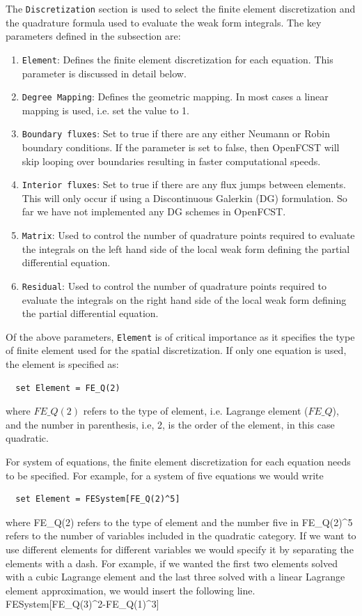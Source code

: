 The \texttt{Discretization} section is used to select the finite element discretization and the quadrature formula used to evaluate the weak form integrals. The key parameters defined in the subsection are:
\begin{enumerate}
\item \texttt{Element}: Defines the finite element discretization for each equation. This parameter is discussed in detail below.
\item \texttt{Degree Mapping}: Defines the geometric mapping. In most cases a linear mapping is used, i.e. set the value to 1.
\item \texttt{Boundary fluxes}: Set to true if there are any either Neumann or Robin boundary conditions. If the parameter is set to false, then OpenFCST will skip looping over boundaries resulting in faster computational speeds.
\item \texttt{Interior fluxes}: Set to true if there are any flux jumps between elements. This will only occur if using a Discontinuous Galerkin (DG) formulation. So far we have not implemented any DG schemes in OpenFCST.
\item \texttt{Matrix}: Used to control the number of quadrature points required to evaluate the integrals on the left hand side of the local weak form defining the partial differential equation. 
\item \texttt{Residual}: Used to control the number of quadrature points required to evaluate the integrals on the right hand side of the local weak form defining the partial differential equation. 
\end{enumerate}

Of the above parameters, \texttt{Element} is of critical importance as it specifies the type of finite element used for the spatial discretization. If only one equation is used, the element is specified as:
\begin{lstlisting}
  set Element = FE_Q(2)
\end{lstlisting}
where $FE\_Q(2)$ refers to the type of element, i.e. Lagrange element ($FE\_Q$), and the number in parenthesis, i.e, 2, is the order of the element, in this case quadratic. 

For system of equations, the finite element discretization for each equation needs to be specified. For example, for a system of five equations we would write
\begin{lstlisting}
  set Element = FESystem[FE_Q(2)^5] 
\end{lstlisting}
where FE\_Q(2) refers to the type of element and the number five in FE\_Q(2)\string^5 refers to the number of variables included in the quadratic category. If we want to use different elements for different variables we would specify it by separating the elements with a dash. For example, if we wanted the first two elements solved with a cubic Lagrange element and the last three solved with a linear Lagrange element approximation, we would insert the following line. FESystem[FE\_Q(3)\string^2-FE\_Q(1)\string^3]

